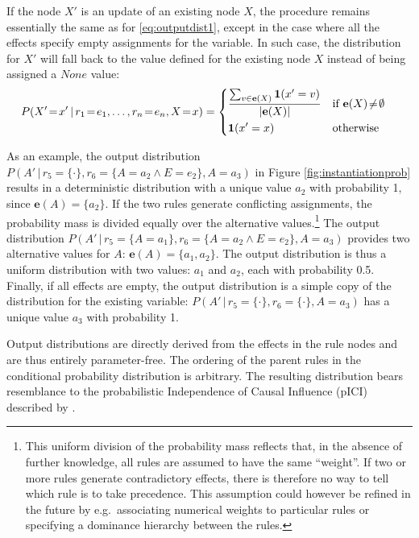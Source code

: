 If the node $X'$ is an update of an existing node $X$, the procedure remains essentially the same as for \eqref{eq:outputdist1}, except in the case where all the effects specify empty assignments for the variable. In such case, the distribution for $X'$ will fall back to the value defined for the existing node $X$ instead of being assigned a $\mathit{None}$ value:
\begin{align}
&P(X'\!=\!x' \, | \, r_1\!=\!e_1, \dots, r_n\!=\!e_n, X\!=\!x) = \begin{dcases} 
\frac{\sum_{v \in {\mathbf{e}(X)}} \mathbf{1}(x' = v)} { |\mathbf{e}(X)| }  & \text{if } \mathbf{e}(X)\!\neq\!\emptyset \\
\mathbf{1}(x' = x) & \text{otherwise}
\end{dcases}\label{eq:outputdist2}
\end{align}

As an example, the output distribution $P(A' \, | \, r_5\!=\!\{\cdot\},r_6\!=\!\{A\!=\!a_2 \land E\!=\!e_2\}, A\!=\!a_3)$ in Figure \ref{fig:instantiationprob} results in a deterministic distribution with a unique value $a_2$ with probability 1, since $\mathbf{e}(A) = \{a_2\}$. If the two rules generate conflicting assignments, the probability mass is divided equally over the alternative values.\footnote{This uniform division of the probability mass reflects that, in the absence of further knowledge, all rules are assumed to have the same ``weight''. If two or more rules generate contradictory effects, there is therefore no way to tell which rule is to take precedence. This assumption could however be refined in the future by e.g.\ associating numerical weights to particular rules or specifying a dominance hierarchy between the rules.}   The output distribution $P(A' \, | \, r_5\!=\!\{A\!=\!a_1\},r_6\!=\!\{A\!=\!a_2 \land E\!=\!e_2\}, A\!=\!a_3)$ provides two alternative values for $A$: $\mathbf{e}(A) = \{a_1,a_2\}$. The output distribution is thus a uniform distribution with two values: $a_1$ and $a_2$, each with probability 0.5. Finally, if all effects are empty, the output distribution is a simple copy of the distribution for the existing variable: $P(A' \, | \, r_5\!=\!\{\cdot\},r_6\!=\!\{\cdot\}, A\!=\!a_3)$ has a unique value $a_3$ with probability 1. 

Output distributions are directly derived from the effects in the rule nodes and are thus entirely parameter-free.  The ordering of the parent rules in the conditional probability distribution is arbitrary. The resulting distribution bears resemblance to the probabilistic Independence of Causal Influence (pICI) described by \cite{diez06}. 


